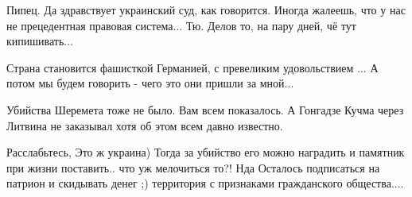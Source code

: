 \begin{itemize}
Пипец. Да здравствует украинский суд, как говорится.
Иногда жалеешь, что у нас не прецедентная правовая система...
Тю. Делов то, на пару дней, чё тут кипишивать...

Страна становится фашисткой Германией, с превеликим удовольствием ...  А потом
мы будем говорить - чего это они пришли за мной...

Убийства Шеремета тоже не было. Вам всем показалось. А Гонгадзе Кучма через Литвина не заказывал хотя об этом всем давно известно.

Расслабьтесь, Это ж украина)
Тогда за убийство его можно наградить и памятник при жизни поставить.. что уж мелочиться то?!
Нда
Осталось подписаться на патрион и скидывать денег ;)
территория с признаками гражданского общества....

\end{itemize}
